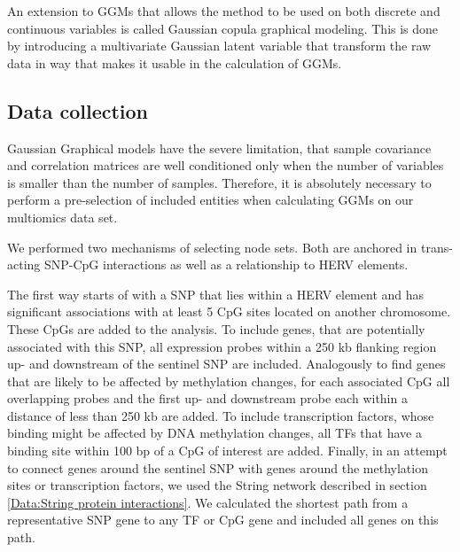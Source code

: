 \documentclass[a4paper,12pt,twoside,openright]{report}
\begin{document}
An extension to GGMs that allows the method to be used on both discrete and continuous variables is called Gaussian copula graphical modeling. This is done by introducing a multivariate Gaussian latent variable that transform the raw data in way that makes it usable in the calculation of GGMs. 

\subsection{Data collection}
\label{Methods:Data collection}
Gaussian Graphical models have the severe limitation, that sample covariance and correlation matrices are well conditioned only when the number of variables is smaller than the number of samples\cite{Schaefer2005}. Therefore, it is absolutely necessary to perform a pre-selection of included entities when calculating GGMs on our multiomics data set.

We performed two mechanisms of selecting node sets. Both are anchored in trans-acting SNP-CpG interactions as well as a relationship to HERV elements. 

The first way starts of with a SNP that lies within a HERV element and has significant associations with at least 5 CpG sites located on another chromosome. These CpGs are added to the analysis.  To include genes, that are potentially associated with this SNP, all expression probes within a 250 kb flanking region up- and downstream of the sentinel SNP are included. Analogously to find genes that are likely to be affected by methylation changes, for each associated CpG all overlapping probes and the first up- and downstream probe each within a distance of less than 250 kb are added. To include transcription factors, whose binding might be affected by DNA methylation changes, all TFs that have a binding site within 100 bp of a CpG of interest are added. Finally, in an attempt to connect genes around the sentinel SNP with genes around the methylation sites or transcription factors, we used the String network described in section \ref{Data:String protein interactions}. We calculated the shortest path from a representative SNP gene to any TF or CpG gene and included all genes on this path.
\end{document}
